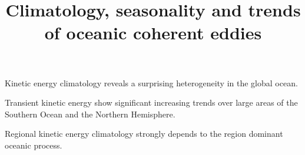 \documentclass[draft]{agujournal2019}
\begin{document}
\title{Climatology, seasonality and trends of oceanic coherent eddies}





\begin{keypoints}
	\item Kinetic energy climatology reveals a surprising heterogeneity in the global ocean.
	\item Transient kinetic energy show significant increasing trends over large areas of the Southern Ocean and the Northern Hemisphere.
	\item Regional kinetic energy climatology strongly depends to the region dominant oceanic process.
\end{keypoints}
\end{document}
